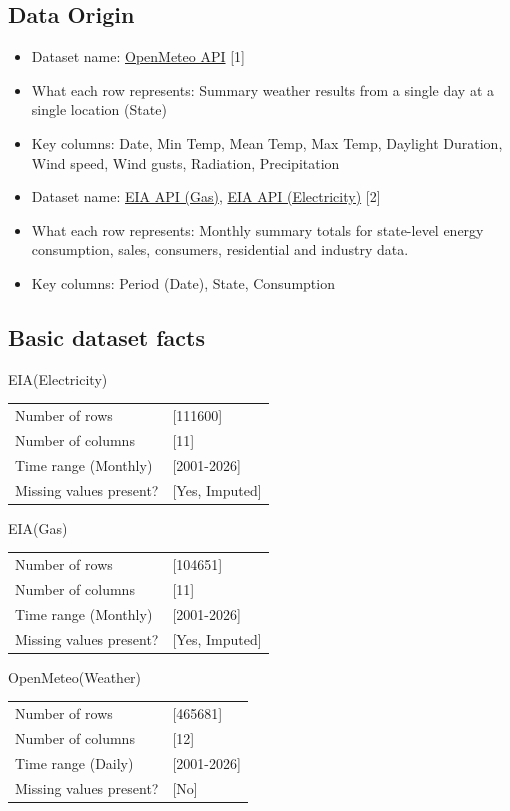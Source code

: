 \documentclass[11pt,a4paper]{article}
\begin{document}
\subsection{Data Origin}
\begin{itemize}
  \item Dataset name: \href{https://open-meteo.com/en/docs/historical-weather-api}{OpenMeteo API} [1]
  \item What each row represents: Summary weather results from a single day at a single location (State)
  \item Key columns: Date, Min Temp, Mean Temp, Max Temp, Daylight Duration, Wind speed, Wind gusts, Radiation, Precipitation
\end{itemize}
\begin{itemize}[leftmargin=18pt]
  \item Dataset name: \href{https://www.eia.gov/opendata/browser/natural-gas}{EIA API (Gas)}, \href{https://www.eia.gov/opendata/browser/electricity}{EIA API (Electricity)} [2]
  \item What each row represents: Monthly summary totals for state-level energy consumption, sales, consumers, residential and industry data.
  \item Key columns: Period (Date), State, Consumption
\end{itemize}

\subsection{Basic dataset facts}
\begin{center}
EIA(Electricity)
\begin{tabular}{ll}
\toprule
Number of rows & [111600] \\
Number of columns & [11] \\
Time range (Monthly) & [2001-2026] \\
Missing values present? & [Yes, Imputed] \\
\bottomrule
\end{tabular}
\end{center}
\begin{center}
EIA(Gas)
\begin{tabular}{ll}
\toprule
Number of rows & [104651] \\
Number of columns & [11] \\
Time range (Monthly) & [2001-2026] \\
Missing values present? & [Yes, Imputed] \\
\bottomrule
\end{tabular}
\end{center}
\begin{center}
OpenMeteo(Weather)
\begin{tabular}{ll}
\toprule
Number of rows & [465681] \\
Number of columns & [12] \\
Time range (Daily) & [2001-2026] \\
Missing values present? & [No] \\
\bottomrule
\end{tabular}
\end{center}
\end{document}
